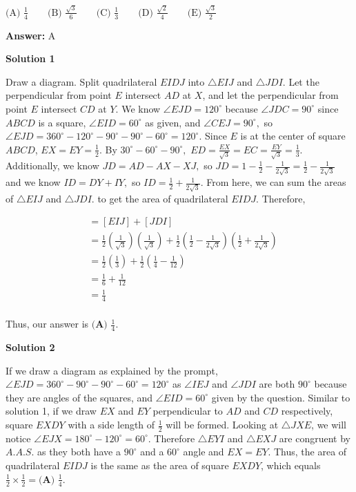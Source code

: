 \begin{enumerate}
 $\text{(A) }\frac{1}{4} \qquad \text{(B) }\frac{\sqrt{3}}{6} \qquad \text{(C) }\frac{1}{3} \qquad \text{(D) }\frac{\sqrt{2}}{4} \qquad \text{(E) }\frac{\sqrt{3}}{2}$

 \textbf{Answer: }A



\textbf{Solution 1}

Draw a diagram. Split quadrilateral $EIDJ$ into $\triangle EIJ$ and $\triangle JDI.$ Let the perpendicular from point $E$ intersect $AD$ at $X$, and let the perpendicular from point $E$ intersect $CD$ at $Y.$ We know $\angle EJD=120^{\circ}$ because $\angle JDC=90^{\circ}$ since $ABCD$ is a square, $\angle EID=60^{\circ}$ as given, and $\angle CEJ = 90^{\circ},$ so $\angle EJD = 360^{\circ}-120^{\circ}-90^{\circ}-90^{\circ}-60^{\circ}=120^{\circ}.$ Since $E$ is at the center of square $ABCD$, $EX=EY=\frac{1}{2}.$ By $30^{\circ}-60^{\circ}-90^{\circ},$ $ED=\frac{EX}{\sqrt{3}}=EC=\frac{EY}{\sqrt{3}}=\frac{1}{3}.$ Additionally, we know $JD=AD-AX-XJ,$ so $JD=1-\frac{1}{2}-\frac{1}{2 \sqrt{3}}=\frac{1}{2}-\frac{1}{2 \sqrt{3}}$ and we know $ID=DY+IY,$ so $ID=\frac{1}{2}+\frac{1}{2 \sqrt{3}}.$ From here, we can sum the areas of $\triangle EIJ$ and $\triangle JDI.$ to get the area of quadrilateral $EIDJ.$ Therefore,

 \begin{align*}[EIDJ]&=[EIJ]+[JDI] \\&=\frac{1}{2}(\frac{1}{\sqrt{3}})(\frac{1}{\sqrt{3}}) + \frac{1}{2} (\frac{1}{2}-\frac{1}{2 \sqrt{3}}) (\frac{1}{2}+\frac{1}{2 \sqrt{3}}) \\&=\frac{1}{2}(\frac{1}{3})+\frac{1}{2}(\frac{1}{4}-\frac{1}{12}) \\&=\frac{1}{6}+\frac{1}{12} \\&=\frac{1}{4} \\\end{align*}


 Thus, our answer is $\boxed{\textbf{(A) } \frac{1}{4}}.$




\textbf{Solution 2}

If we draw a diagram as explained by the prompt, $\angle EJD = 360^{\circ}-90^{\circ}-90^{\circ}-60^{\circ} = 120^{\circ}$ as $\angle IEJ$ and $\angle JDI$ are both $90^{\circ}$ because they are angles of the squares, and $\angle EID=60^{\circ}$ given by the question. Similar to solution 1, if we draw $EX$ and $EY$ perpendicular to $AD$ and $CD$ respectively, square $EXDY$ with a side length of $\frac{1}{2}$ will be formed. Looking at $\triangle JXE$, we will notice $\angle EJX = 180^{\circ}-120^{\circ}=60^{\circ}$. Therefore $\triangle EYI$ and $\triangle EXJ$ are congruent by $A.A.S.$ as they both have a $90^{\circ}$ and a $60^{\circ}$ angle and $EX=EY$. Thus, the area of quadrilateral $EIDJ$ is the same as the area of square $EXDY$, which equals $\frac{1}{2} \times \frac{1}{2} = \boxed{\textbf{(A) } \frac{1}{4}}.$





\end{enumerate}
